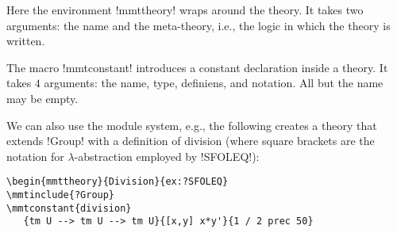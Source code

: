 Here the environment !mmttheory! wraps around the theory.
It takes two arguments: the name and the meta-theory, i.e., the logic in which the theory is written.

The macro !mmtconstant! introduces a constant declaration inside a theory.
It takes $4$ arguments: the name, type, definiens, and notation. All but the name may be empty.

We can also use the \mmt module system, e.g., the following creates a theory that extends !Group! with a definition of division (where square brackets are the notation for $\lambda$-abstraction employed by !SFOLEQ!):

\begin{lstlisting}
\begin{mmttheory}{Division}{ex:?SFOLEQ}
\mmtinclude{?Group}
\mmtconstant{division}
   {tm U --> tm U --> tm U}{[x,y] x*y'}{1 / 2 prec 50}
\end{lstlisting}

